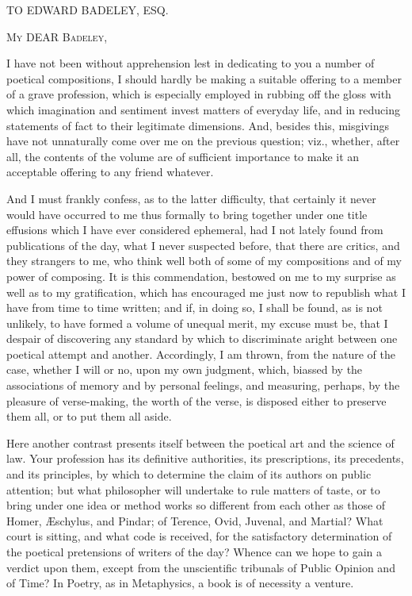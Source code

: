 



TO EDWARD BADELEY, ESQ.


M\textsc{y} DEAR B\textsc{adeley},

I have not been without apprehension lest in dedicating to you a
number of poetical compositions, I should hardly be making a suitable
offering to a member of a grave profession, which is especially
employed in rubbing off the gloss with which imagination and sentiment
invest matters of everyday life, and in reducing statements of fact to
their legitimate dimensions. And, besides this, misgivings have not
unnaturally come over me on the previous question; viz., whether,
after all, the contents of the volume are of sufficient importance to
make it an acceptable offering to any friend whatever.


And I must frankly confess, as to the latter difficulty, that
certainly it never would have occurred to me thus formally to bring
together under one title effusions which I have ever considered
ephemeral, had I not lately found from publications of the day, what I
never suspected before, that there are critics, and they strangers to
me, who think well both of some of my compositions and of my power of
composing. It is this commendation, bestowed on me to my surprise as
well as to my gratification, which has encouraged me just now to
republish what I have from time to time written; and if, in doing so,
I shall be found, as is not unlikely, to have formed a volume of
unequal merit, my excuse must be, that I despair of discovering any
standard by which to discriminate aright between one poetical attempt
and another. Accordingly, I am thrown, from the nature of the case,
whether I will or no, upon my own judgment, which, biassed by the
associations of memory and by personal feelings, and measuring,
perhaps, by the pleasure of verse-making, the worth of the verse, is
disposed either to preserve them all, or to put them all aside.


Here another contrast presents itself between the poetical art and
the science of law. Your profession has its definitive authorities, its
prescriptions, its precedents, and its principles, by which to
determine the claim of its authors on public attention; but what
philosopher will undertake to rule matters of taste, or to bring under
one idea or method works so different from each other as those of
Homer, Æschylus, and Pindar; of Terence, Ovid, Juvenal, and Martial?
What court is sitting, and what code is received, for the satisfactory
determination of the poetical pretensions of writers of the day?
Whence can we hope to gain a verdict upon them, except from the
unscientific tribunals of Public Opinion and of Time? In Poetry, as in
Metaphysics, a book is of necessity a venture.


